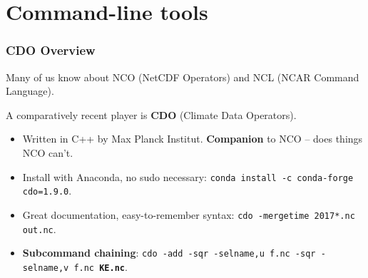 \documentclass[aspectratio=169]{beamer}
\begin{document}
\section{Command-line tools}

\begin{frame}
\frametitle{CDO Overview}

  Many of us know about NCO
  ({\color{red}N}et{\color{red}C}DF {\color{red}O}perators) and
  NCL ({\color{red}N}CAR {\color{red}C}ommand {\color{red}L}anguage).

  A comparatively recent player is \textbf{CDO}
  ({\color{red}C}limate {\color{red}D}ata {\color{red}O}perators).

  \begin{itemize}
    \item
      Written in C++ by Max Planck Institut. \textbf{Companion} to NCO
    -- does things NCO can't.
    \item
      Install with Anaconda, no sudo necessary:
      \texttt{conda install -c conda-forge cdo=1.9.0}.
    \item
      Great documentation, easy-to-remember syntax:
      \texttt{cdo -mergetime 2017*.nc out.nc}.
    \item
      \textbf{Subcommand chaining}:
      \texttt{cdo -add -sqr -selname,u f.nc -sqr -selname,v f.nc \textbf{KE.nc}}.
  \end{itemize}


\end{frame}
\end{document}
